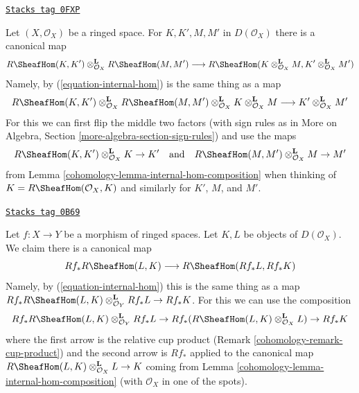 \begin{remark}
\label{cohomology-remark-tensor-internal-hom}
\href{https://stacks.math.columbia.edu/tag/0FXP}{\texttt{Stacks tag 0FXP}}

Let $(X, \mathcal{O}_X)$ be a ringed space. For $K, K', M, M'$ in
$D(\mathcal{O}_X)$ there is a canonical map
$$
R\SheafHom(K, K') \otimes_{\mathcal{O}_X}^\mathbf{L}
R\SheafHom(M, M')
\longrightarrow
R\SheafHom(K \otimes_{\mathcal{O}_X}^\mathbf{L} M,
K' \otimes_{\mathcal{O}_X}^\mathbf{L} M')
$$
Namely, by (\ref{equation-internal-hom}) is the same thing as a map
$$
R\SheafHom(K, K') \otimes_{\mathcal{O}_X}^\mathbf{L}
R\SheafHom(M, M') \otimes_{\mathcal{O}_X}^\mathbf{L}
K \otimes_{\mathcal{O}_X}^\mathbf{L} M
\longrightarrow
K' \otimes_{\mathcal{O}_X}^\mathbf{L} M'
$$
For this we can first flip the middle two factors
(with sign rules as in More on Algebra, Section
\ref{more-algebra-section-sign-rules})
and use the maps
$$
R\SheafHom(K, K') \otimes_{\mathcal{O}_X}^\mathbf{L} K \to K'
\quad\text{and}\quad
R\SheafHom(M, M') \otimes_{\mathcal{O}_X}^\mathbf{L} M \to M'
$$
from Lemma \ref{cohomology-lemma-internal-hom-composition} when thinking
of $K = R\SheafHom(\mathcal{O}_X, K)$ and similarly for
$K'$, $M$, and $M'$.
\end{remark}

\begin{remark}
\label{cohomology-remark-projection-formula-for-internal-hom}
\href{https://stacks.math.columbia.edu/tag/0B69}{\texttt{Stacks tag 0B69}}

Let $f : X \to Y$ be a morphism of ringed spaces.
Let $K, L$ be objects of $D(\mathcal{O}_X)$. We claim there is a canonical map
$$
Rf_*R\SheafHom(L, K) \longrightarrow R\SheafHom(Rf_*L, Rf_*K)
$$
Namely, by (\ref{equation-internal-hom}) this is the same thing
as a map
$Rf_*R\SheafHom(L, K) \otimes_{\mathcal{O}_Y}^\mathbf{L} Rf_*L \to Rf_*K$.
For this we can use the composition
$$
Rf_*R\SheafHom(L, K) \otimes_{\mathcal{O}_Y}^\mathbf{L} Rf_*L \to
Rf_*(R\SheafHom(L, K) \otimes_{\mathcal{O}_X}^\mathbf{L} L) \to
Rf_*K
$$
where the first arrow is the relative cup product
(Remark \ref{cohomology-remark-cup-product}) and the second arrow is $Rf_*$ applied
to the canonical map
$R\SheafHom(L, K) \otimes_{\mathcal{O}_X}^\mathbf{L} L \to K$
coming from Lemma \ref{cohomology-lemma-internal-hom-composition}
(with $\mathcal{O}_X$ in one of the spots).
\end{remark}

